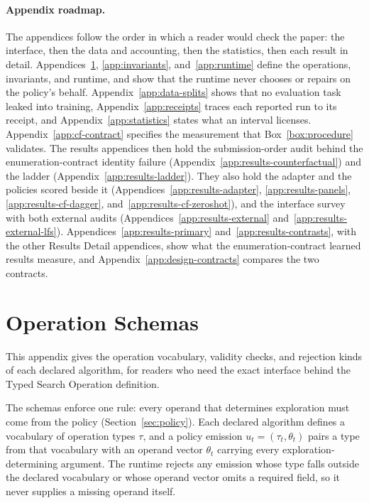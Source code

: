 

\paragraph{Appendix roadmap.} The appendices follow the order in which a reader would check the paper: the interface, then the data and accounting, then the statistics, then each result in detail. Appendices~\ref{appendix}, \ref{app:invariants}, and~\ref{app:runtime} define the operations, invariants, and runtime, and show that the runtime never chooses or repairs on the policy's behalf. Appendix~\ref{app:data-splits} shows that no evaluation task leaked into training, Appendix~\ref{app:receipts} traces each reported run to its receipt, and Appendix~\ref{app:statistics} states what an interval licenses. Appendix~\ref{app:cf-contract} specifies the measurement that Box~\ref{box:procedure} validates. The results appendices then hold the submission-order audit behind the enumeration-contract identity failure (Appendix~\ref{app:results-counterfactual}) and the ladder (Appendix~\ref{app:results-ladder}). They also hold the adapter and the policies scored beside it (Appendices~\ref{app:results-adapter}, \ref{app:results-panels}, \ref{app:results-cf-dagger}, and~\ref{app:results-cf-zeroshot}), and the interface survey with both external audits (Appendices~\ref{app:results-external} and~\ref{app:results-external-lfs}). Appendices~\ref{app:results-primary} and~\ref{app:results-contrasts}, with the other Results Detail appendices, show what the enumeration-contract learned results measure, and Appendix~\ref{app:design-contracts} compares the two contracts.

\section{Operation Schemas}
\label{appendix}

This appendix gives the operation vocabulary, validity checks, and rejection kinds of each declared algorithm, for readers who need the exact interface behind the Typed Search Operation definition.

The schemas enforce one rule: every operand that determines exploration must come from the policy (Section~\ref{sec:policy}). Each declared algorithm defines a vocabulary of operation types $\tau$, and a policy emission $u_t = (\tau_t, \theta_t)$ pairs a type from that vocabulary with an operand vector $\theta_t$ carrying every exploration-determining argument. The runtime rejects any emission whose type falls outside the declared vocabulary or whose operand vector omits a required field, so it never supplies a missing operand itself.

